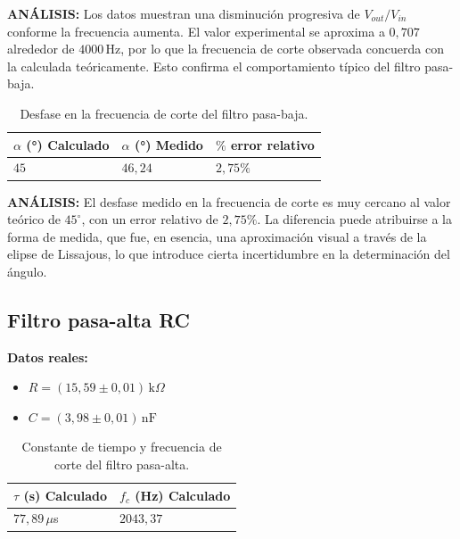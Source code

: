 \documentclass[12pt,a4paper]{article}
\begin{document}
\textbf{ANÁLISIS:} Los datos muestran una disminución progresiva de $V_{out}/V_{in}$ conforme la frecuencia aumenta. El valor experimental se aproxima a $0,707$ alrededor de $4000\,\mathrm{Hz}$, por lo que la frecuencia de corte observada concuerda con la calculada teóricamente. Esto confirma el comportamiento típico del filtro pasa-baja.

\bigskip
\begin{table}[H]
	\centering
	\fontsize{10pt}{12pt}\selectfont
	\renewcommand{\arraystretch}{1.2}
	\setlength{\tabcolsep}{6pt}
	{\begin{tabular}{|C{3cm}|C{3cm}|C{3cm}|}
	\hline
	\textbf{$\alpha$ (°) Calculado} & \textbf{$\alpha$ (°) Medido} & \textbf{$\%$ error relativo} \\
	\hline
	$45$ & $46,24$ & $2,75\%$ \\
	\hline
	\end{tabular}}
	\caption{Desfase en la frecuencia de corte del filtro pasa-baja.}
	\label{tab:tabla-5-3}
\end{table}

\textbf{ANÁLISIS:} El desfase medido en la frecuencia de corte es muy cercano al valor teórico de $45^\circ$, con un error relativo de $2,75\%$. La diferencia puede atribuirse a la forma de medida, que fue, en esencia, una aproximación visual a través de la elipse de Lissajous, lo que introduce cierta incertidumbre en la determinación del ángulo.

\subsection{Filtro pasa-alta RC}

\textbf{Datos reales:}
\begin{itemize}
	\item $R = (15,59 \pm 0,01)\,\mathrm{k}\Omega$
	\item $C = (3,98 \pm 0,01)\,\mathrm{nF}$
\end{itemize}

\begin{table}[H]
	\centering
	\fontsize{10pt}{12pt}\selectfont
	\renewcommand{\arraystretch}{1.2}
	\setlength{\tabcolsep}{6pt}
	{\begin{tabular}{|C{3.2cm}|C{4cm}|}
	\hline
	\textbf{$\tau$ (s) Calculado} & \textbf{$f_c$ (Hz) Calculado}\\
	\hline
	$77,89\,\mu$s & $2043,37$\\
	\hline
	\end{tabular}}
	\caption{Constante de tiempo y frecuencia de corte del filtro pasa-alta.}
	\label{tab:tabla-5-4}
\end{table}
\end{document}
